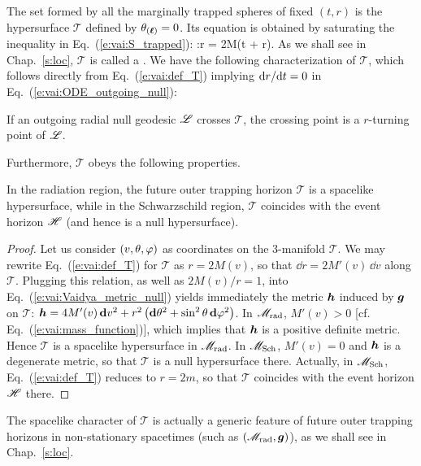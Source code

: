 The set formed by all the marginally trapped spheres
of fixed $(t,r)$
is the hypersurface $\mathscr{T}$ defined by $\theta_{(\bm{\ell})} = 0$.
Its equation is obtained by saturating the inequality
in Eq.~(\ref{e:vai:S_trapped}):
\be \label{e:vai:def_T}
    :\qquad r = 2M(t + r).
\ee
As we shall see in
Chap.~\ref{s:loc}, $\mathscr{T}$ is called a
.
We have the following characterization of $\mathscr{T}$, which follows directly
from Eq.~(\ref{e:vai:def_T}) implying $\mathrm{d} r / \mathrm{d} t = 0$ in Eq.~(\ref{e:vai:ODE_outgoing_null}):
\begin{greybox}
If an outgoing radial null geodesic $\mathscr{L}$ crosses $\mathscr{T}$,
the crossing point is a $r$-turning point of $\mathscr{L}$.
\end{greybox}
Furthermore, $\mathscr{T}$ obeys the following properties.
\begin{greybox}
In the radiation region, the future outer trapping horizon $\mathscr{T}$ is a
spacelike hypersurface, while in the Schwarzschild region, $\mathscr{T}$
coincides with the event horizon $\mathscr{H}$ (and hence is a null hypersurface).
\end{greybox}
\begin{proof}
Let us consider $(v,\theta,\varphi)$ as coordinates on the 3-manifold $\mathscr{T}$.
We may rewrite Eq.~(\ref{e:vai:def_T}) for $\mathscr{T}$ as $r = 2M(v)$, so that
$\dd r = 2M'(v) \, \dd v$ along $\mathscr{T}$.
Plugging this relation, as well as $2M(v)/r=1$, into Eq.~(\ref{e:vai:Vaidya_metric_null})
yields immediately the metric $\bm{h}$ induced by $\bm{g}$ on $\mathscr{T}$:
$\bm{h} = 4 M'(v) \, \mathbf{d} v^2
        + r^2 \left( \mathbf{d}\theta^2 + \sin^2\theta\, \mathbf{d}\varphi^2 \right)$.
In $\mathscr{M}_{\rm rad}$, $M'(v) > 0$ [cf. Eq.~(\ref{e:vai:mass_function})], which
implies that $\bm{h}$ is a positive definite metric. Hence $\mathscr{T}$
is a spacelike hypersurface in $\mathscr{M}_{\rm rad}$. In $\mathscr{M}_{\rm Sch}$, $M'(v) = 0$ and $\bm{h}$
is a degenerate metric, so that $\mathscr{T}$ is a null hypersurface there.
Actually, in $\mathscr{M}_{\rm Sch}$, Eq.~(\ref{e:vai:def_T}) reduces
to $r = 2m$, so that $\mathscr{T}$ coincides with the event horizon $\mathscr{H}$ there.
\end{proof}

\begin{remark}
The spacelike character of $\mathscr{T}$ is actually a generic feature of future outer trapping horizons in non-stationary spacetimes (such as $(\mathscr{M}_{\rm rad},\bm{g})$),
as we shall see in Chap.~\ref{s:loc}.
\end{remark}

